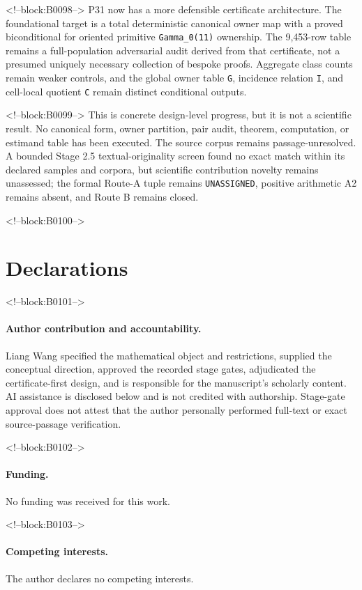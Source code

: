 \documentclass[11pt]{article}
\begin{document}
<!--block:B0098-->
P31 now has a more defensible certificate architecture. The foundational
target is a total deterministic canonical owner map with a proved
biconditional for oriented primitive \texttt{Gamma\_0(11)} ownership.
The 9,453-row table remains a full-population adversarial audit derived
from that certificate, not a presumed uniquely necessary collection of
bespoke proofs. Aggregate class counts remain weaker controls, and the
global owner table \texttt{G}, incidence relation \texttt{I}, and
cell-local quotient \texttt{C} remain distinct conditional outputs.

<!--block:B0099-->
This is concrete design-level progress, but it is not a scientific
result. No canonical form, owner partition, pair audit, theorem,
computation, or estimand table has been executed. The source corpus
remains passage-unresolved. A bounded Stage 2.5 textual-originality
screen found no exact match within its declared samples and corpora, but
scientific contribution novelty remains unassessed; the formal Route-A
tuple remains \texttt{UNASSIGNED}, positive arithmetic A2 remains absent,
and Route B remains closed.

<!--block:B0100-->
\section*{Declarations}

<!--block:B0101-->
\paragraph{Author contribution and accountability.}
Liang Wang specified the mathematical object and restrictions, supplied
the conceptual direction, approved the recorded stage gates,
adjudicated the certificate-first design, and is responsible for the
manuscript's scholarly content. AI assistance is disclosed below and is
not credited with authorship. Stage-gate approval does not attest that
the author personally performed full-text or exact source-passage
verification.

<!--block:B0102-->
\paragraph{Funding.} No funding was received for this work.

<!--block:B0103-->
\paragraph{Competing interests.} The author declares no competing
interests.
\end{document}
